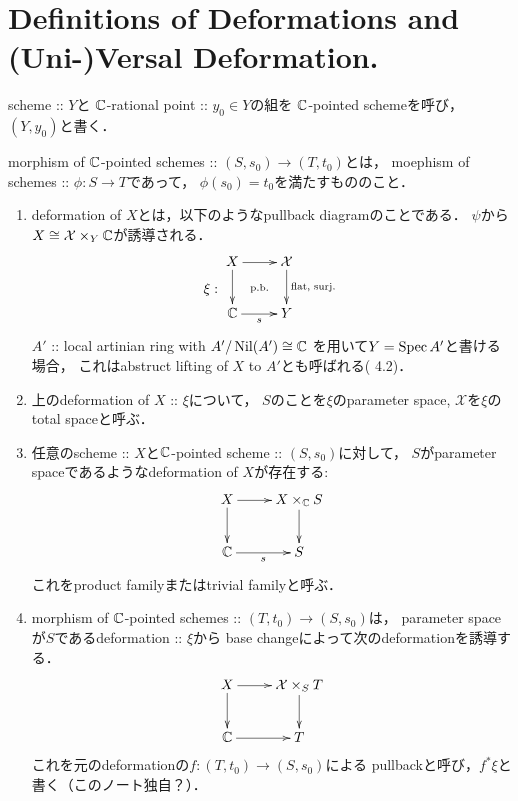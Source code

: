 \documentclass[a4paper]{jsarticle}
\makeatletter
\newcommand{\centerpb}{\ar@{}[lu]|{\text{p.b.}}}
\newcommand{\defX}{\mathcal{X}}
\makeatother
\begin{document}
    \section{Definitions of Deformations and (Uni-)Versal Deformation.}
\begin{Def}
    scheme :: $Y$と
    $\mathbb{C}$-rational point :: $y_0 \in Y$の組を
    $\mathbb{C}$-pointed schemeを呼び，$(Y, y_0)$と書く．

    morphism of $\mathbb{C}$-pointed schemes :: $(S, s_0) \to (T, t_0)$とは，
    moephism of schemes :: $\phi: S \to T$であって，
    $\phi(s_0)=t_0$を満たすもののこと．
\end{Def}

\begin{Def}
    \begin{enumerate}[label=(\roman*), leftmargin=*]
    \item 
        deformation of $X$とは，以下のようなpullback diagramのことである．
        $\psi$から$X \iso \defX \times_{Y} \C$が誘導される．
        \[
            \xi:
        \vcenter{\xymatrix{
            X \ar[r] \ar[d]& \defX \ar[d]^-{\text{flat, surj.}} \\
            \C \ar[r]_-{s}& Y
            \centerpb
        }}
        \]
        $A'$ :: local artinian ring with $A'/\operatorname{Nil}(A') \cong \mathbb{C}$
        を用いて$Y=\operatorname{Spec} A'$と書ける場合，
        これはabstruct lifting of $X$ to $A'$とも呼ばれる(\cite{DefLCI} 4.2)．

    \item
        上のdeformation of $X$ :: $\xi$について，
        $S$のことを$\xi$のparameter space,
        $\defX$を$\xi$のtotal spaceと呼ぶ．

    \item
        任意のscheme :: $X$と$\mathbb{C}$-pointed scheme :: $(S, s_0)$に対して，
        $S$がparameter spaceであるようなdeformation of $X$が存在する:
        \[\xymatrix{
                X \ar[r]\ar[d]& X \times_{\C} S \ar[d]\\
                \C \ar[r]_-{s}& S
        }\]
        これをproduct familyまたはtrivial familyと呼ぶ．

    \item
        morphism of $\mathbb{C}$-pointed schemes :: $(T, t_0) \to (S, s_0)$は，
        parameter spaceが$S$であるdeformation :: $\xi$から
        base changeによって次のdeformationを誘導する．
        \[\xymatrix{
            X \ar[r]\ar[d]& \defX \times_S T \ar[d]\\
            \C \ar[r]& T
        }\]
        これを元のdeformationの$f: (T, t_0) \to (S, s_0)$による
        pullbackと呼び，$f^* \xi$と書く（このノート独自？）．


\end{enumerate}
\end{Def}
\end{document}
